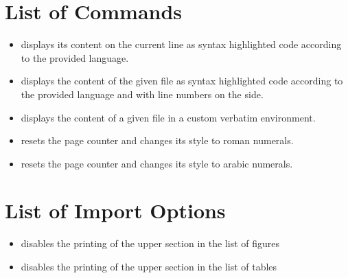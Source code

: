 \documentclass{report}
\begin{document}
\section{List of Commands}
\begin{itemize}
    \item {} displays its content on the current line as syntax highlighted code according to the provided language.
    \item {} displays the content of the given file as syntax highlighted code according to the provided language and with line numbers on the side.
    \item {} displays the content of a given file in a custom verbatim environment.
    \item {} resets the page counter and changes its style to roman numerals.
    \item {} resets the page counter and changes its style to arabic numerals.
\end{itemize}


\section{List of Import Options}
\begin{itemize}
    \item {} disables the printing of the upper section in the list of figures
    \item {} disables the printing of the upper section in the list of tables
\end{itemize}


\imtaMakeCover
\end{document}
